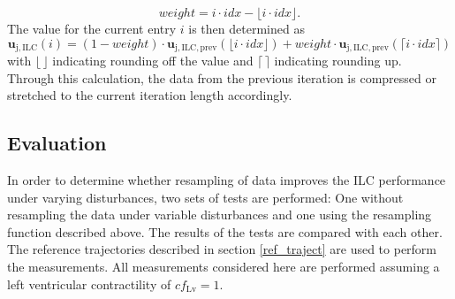 \begin{equation}
  weight= i \cdot idx - \lfloor i \cdot idx\rfloor.
\end{equation}
The value for the current entry $i$ is then determined as
\begin{equation}
  \mathbf{u}_{\mathrm{j,ILC}}(i) = (1-weight) \cdot \mathbf{u}_{\mathrm{j,ILC,prev}}(\lfloor i \cdot idx\rfloor) + weight\cdot \mathbf{u}_{\mathrm{j,ILC,prev}}(\lceil i \cdot idx\rceil)
\end{equation}
with $\lfloor\, \rfloor$ indicating rounding off the value and $\lceil\, \rceil$ indicating rounding up.
Through this calculation, the data from the previous iteration is compressed or stretched to the current iteration length accordingly.

\subsection{Evaluation}
In order to determine whether resampling of data improves the ILC performance under varying disturbances, two sets of tests are performed: One without resampling the data under variable disturbances and one using the resampling function described above. The results of the tests are compared with each other.
The reference trajectories described in section \ref{ref_traject} are used to perform the measurements. All measurements considered here are performed assuming a left ventricular contractility of $cf_{\mathrm{Lv}}=1$.


